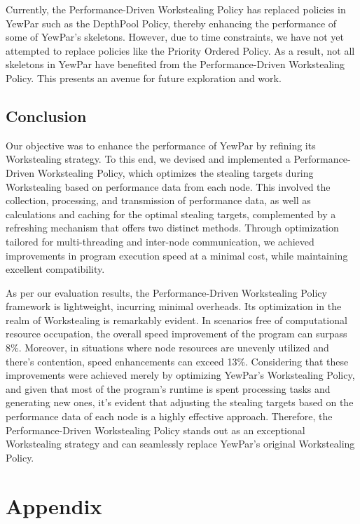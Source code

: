 \documentclass{mproj}
\begin{document}
Currently, the Performance-Driven Workstealing Policy has replaced policies in YewPar such as the DepthPool Policy,
thereby enhancing the performance of some of YewPar's skeletons.
However, due to time constraints, we have not yet attempted to replace policies like the Priority Ordered Policy.
As a result, not all skeletons in YewPar have benefited from the Performance-Driven Workstealing Policy.
This presents an avenue for future exploration and work.

\section{Conclusion}
Our objective was to enhance the performance of YewPar by refining its Workstealing strategy.
To this end, we devised and implemented a Performance-Driven Workstealing Policy,
which optimizes the stealing targets during Workstealing based on performance data from each node.
This involved the collection, processing, and transmission of performance data,
as well as calculations and caching for the optimal stealing targets,
complemented by a refreshing mechanism that offers two distinct methods.
Through optimization tailored for multi-threading and inter-node communication,
we achieved improvements in program execution speed at a minimal cost,
while maintaining excellent compatibility.

As per our evaluation results,
the Performance-Driven Workstealing Policy framework is lightweight, incurring minimal overheads.
Its optimization in the realm of Workstealing is remarkably evident.
In scenarios free of computational resource occupation,
the overall speed improvement of the program can surpass 8\%.
Moreover, in situations where node resources are unevenly utilized and there's contention,
speed enhancements can exceed 13\%.
Considering that these improvements were achieved merely by optimizing YewPar's Workstealing Policy,
and given that most of the program's runtime is spent processing tasks and generating new ones,
it's evident that adjusting the stealing targets based on the performance data of each node is a highly effective approach.
Therefore, the Performance-Driven Workstealing Policy stands out as an exceptional Workstealing strategy
and can seamlessly replace YewPar's original Workstealing Policy.


\appendix %
\chapter{Appendix}\label{appendix:link}
\end{document}
